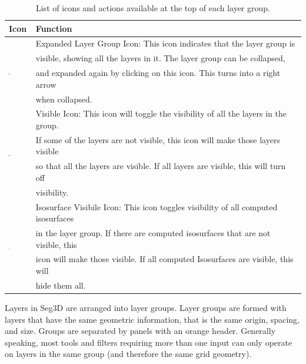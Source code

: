 \documentclass[fleqn,11pt,openany]{book}
\begin{document}
 \begin{table}[h!]
\label{tab:layertopicons}
\caption{List of icons and actions available at the top of each layer group.}
\begin{tabular}{|l|l|}
\hline
{\bf Icon} & {\bf Function}\\
\hline
\multirow{4}{*}{ \includegraphics[width=0.05\textwidth]{Seg3DBasicFunctionality_figures/DownArrow.png} }
& Expanded Layer Group Icon:  This icon indicates that the layer group is \\
& visible, showing all the layers in it.  The layer group can be collapsed, \\
& and expanded again by clicking on this icon. This turns into a right arrow \\
& when collapsed.\\
\hline
\multirow{4}{*}{ \includegraphics[width=0.05\textwidth]{Seg3DBasicFunctionality_figures/VisibleOff.png} }
& Visible Icon: This icon will toggle the visibility of all the layers in the group.\\
&  If some of the layers are not visible, this icon will make those layers visible\\
& so that all the layers are visible.  If all layers are visible, this will turn off\\
& visibility.\\
\hline
\multirow{4}{*}{ \includegraphics[width=0.05\textwidth]{Seg3DBasicFunctionality_figures/IsosurfaceVisibleOff.png} }
& Isosurface Visibile Icon: This icon toggles visibility of all computed isosurfaces\\
& in the layer group.  If there are computed isosurfaces that are not visible, this \\
& icon will make those visible.  If all computed Isosurfaces are visible, this will \\
& hide them all.\\
\hline
\end{tabular}
\end{table}

 
 Layers in Seg3D are arranged into layer groups.  Layer groups are formed with layers that have the same geometric information, that is the same origin, spacing, and size.  Groups are separated by panels with an orange header.  Generally speaking, most tools and filters requiring more than one input can only operate on layers in the same group (and therefore the same grid geometry).  
 
\end{document}
